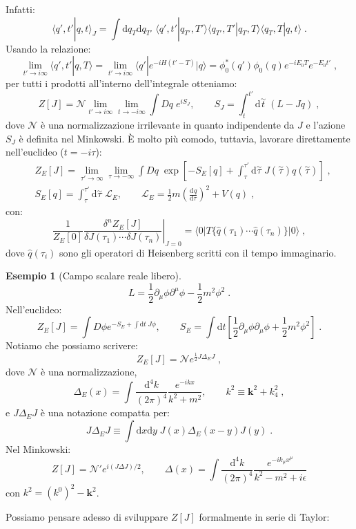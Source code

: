 \documentclass[12pt,a4paper]{article}
\theoremstyle{definition}
\newtheorem{exm}{Esempio}
\newcommand{\dev}[3][]{\frac{\mathrm{d}^{#1} #2}{\mathrm{d} #3^{#1}}}
\newcommand{\lag}{\mathcal{L}}
\numberwithin{equation}{section}
\newcommand{\diff}[1][]{\mathrm{d}#1}
\newcommand{\bra}{\langle}
\newcommand{\ket}{\rangle}
\begin{document}
Infatti:
$$
\bra q',t'|q,t\ket_J=\int\diff{q_T}\diff{q_{T'}}\;\bra q',t'|q_{T'},T'\ket\bra q_{T'},T'|q_T,T\ket\bra q_T,T|q,t\ket\;.
$$
Usando la relazione:
$$
\lim_{t'\to i\infty}\bra q',t'|q,T\ket=\lim_{t'\to i\infty}\bra q'|e^{-iH(t'-T)}|q\ket=\phi_0^*(q')\phi_0(q)e^{-iE_0T}e^{-E_0t'}\;,
$$
per tutti i prodotti all'interno dell'integrale otteniamo:
\begin{equation}
Z[J]=\mathcal{N}\lim_{t'\to i\infty}\lim_{t\to -i\infty}\int Dq\; e^{iS_J},\qquad S_J=\int_t^{t'}\diff{\stackrel{\sim}{t}}\; (L-Jq)\;,
\end{equation}
dove $\mathcal{N}$ è una normalizzazione irrilevante in quanto indipendente da $J$ e l'azione $S_J$ è definita nel Minkowski. È molto più comodo, tuttavia, lavorare direttamente nell'euclideo ($t=-i\tau$):
\begin{align}
&Z_E[J]=\lim_{\tau'\to\infty}\lim_{\tau\to-\infty}\int Dq\;\exp\left[-S_E[q]+\int_{\tau}^{\tau'}\diff{\stackrel{\sim}{\tau}}\;J(\stackrel{\sim}{\tau})q(\stackrel{\sim}{\tau})\right]\;, \\
&S_E[q]=\int_{\tau}^{\tau'}\diff{\stackrel{\sim}{\tau}}\;\lag_E,\qquad \lag_E=\frac{1}{2}m\left(\dev{q}{\tau}\right)^2+V(q)\;,
\end{align}
con:
\begin{equation}
\frac{1}{Z_E[0]}\left.\frac{\delta^n Z_E[J]}{\delta J(\tau_1)\cdots\delta J(\tau_n)}\right|_{J=0}=\bra 0|T\{\hat{q}(\tau_1)\cdots\hat{q}(\tau_n)\}|0\ket\;,
\end{equation}
dove $\hat{q}(\tau_i)$ sono gli operatori di Heisenberg scritti con il tempo immaginario.
\begin{exm}[Campo scalare reale libero] 
$$
L=\frac{1}{2}\partial_{\mu}\phi\partial^{\mu}\phi-\frac{1}{2}m^2\phi^2\;.
$$
Nell'euclideo:
$$
Z_E[J]=\int D\phi e^{-S_E+\int \diff{t}\; J\phi},\qquad S_E=\int\diff{t}\left[\frac{1}{2}\partial_{\mu}\phi\partial_{\mu}\phi+\frac{1}{2}m^2\phi^2\right]\;.
$$
Notiamo che possiamo scrivere:
$$
Z_E[J]=\mathcal{N}e^{\frac{1}{2}J\Delta_E J}\;,
$$
dove $\mathcal{N}$ è una normalizzazione,
$$
\Delta_E(x)=\int\frac{\diff^4{k}}{(2\pi)^4}\frac{e^{-ikx}}{k^2+m^2},\qquad k^2\equiv \mathbf{k}^2+k_4^2\;,
$$
e $J\Delta_EJ$ è una notazione compatta per:
$$
J\Delta_EJ\equiv\int\diff{x}\diff{y}\; J(x)\Delta_E(x-y)J(y)\;.
$$
Nel Minkowski:
$$
Z[J]=\mathcal{N'}e^{i(J\Delta J)/2},\qquad \Delta(x)=\int\frac{\diff^4{k}}{(2\pi)^4}\frac{e^{-ik_{\mu}x^{\mu}}}{k^2-m^2+i\epsilon}
$$
con $k^2=(k^0)^2-\mathbf{k}^2$.
\end{exm}
Possiamo pensare adesso di sviluppare $Z[J]$ formalmente in serie di Taylor:
\end{document}
